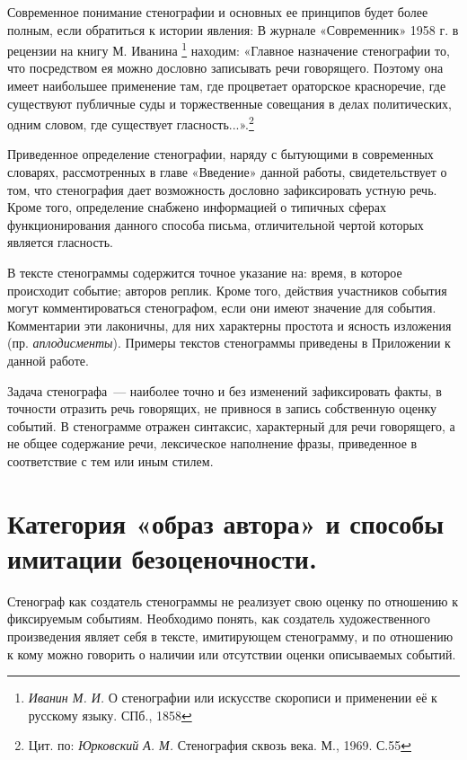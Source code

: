 \documentclass{kursa4}
\begin{document}
{      Современное понимание стенографии и основных ее принципов будет более полным, если обратиться к истории явления: В журнале «Современник» 1958 г. в рецензии на книгу М. Иванина \footnote{\textit{Иванин М. И. }О стенографии или искусстве скорописи и применении её к русскому языку. СПб., 1858} находим: «Главное назначение стенографии то, что посредством ея можно дословно записывать речи говорящего. Поэтому она имеет наибольшее применение там, где процветает ораторское красноречие, где существуют публичные суды и торжественные совещания в делах политических, одним словом, где существует гласность...».\footnote{{ Цит. по: }\textit{{Юрковский А. М.
      }}{Стенография сквозь века. М., 1969. С.55}}{ }

       Приведенное определение стенографии, наряду с бытующими в современных словарях, рассмотренных в главе «Введение» данной работы, свидетельствует о том, что стенография дает возможность дословно зафиксировать устную речь. Кроме того, определение снабжено информацией о типичных сферах функционирования данного способа письма, отличительной чертой которых является гласность. 

      В тексте стенограммы содержится точное указание на: время, в которое происходит событие; авторов реплик. Кроме того, действия участников события могут комментироваться стенографом, если они имеют значение для события. Комментарии эти лаконичны, для них характерны простота и ясность изложения (пр. \textit{аплодисменты}). Примеры текстов стенограммы приведены в Приложении к данной работе. 

      Задача стенографа~--- наиболее точно и без изменений зафиксировать факты, в точности отразить речь говорящих, не привнося в запись собственную оценку событий. В стенограмме отражен синтаксис, характерный для речи говорящего, а не общее содержание речи, лексическое наполнение фразы, приведенное в соответствие с тем или иным стилем. 

    \section{Категория «образ автора» и способы имитации безоценочности.}

      Стенограф как создатель стенограммы не реализует свою оценку по отношению к фиксируемым событиям. Необходимо понять, как создатель художественного произведения являет себя в тексте, имитирующем стенограмму, и по отношению к кому можно говорить о наличии или отсутствии оценки описываемых событий. 

}
\end{document}
